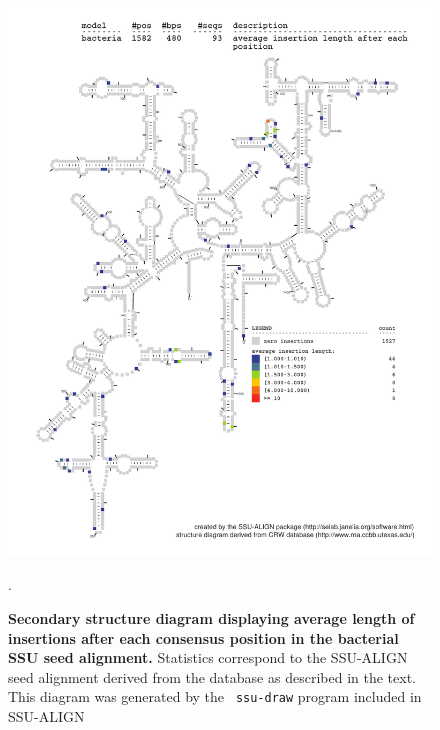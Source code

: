 \begin{figure}
\begin{center}
\includegraphics[width=5.7in]{Figures/bacteria-0p1-iavglen}
\end{center}
\caption[Secondary structure diagram displaying average length of insertions
  after each consensus position in the bacterial SSU seed
  alignment]{\textbf{Secondary structure diagram displaying average
    length of insertions after each consensus position in the bacterial SSU seed
  alignment.} Statistics correspond to the SSU-ALIGN seed
  alignment derived from the  database \cite{CannoneGutell02}
  as described in the text. This diagram was generated by the {\tt
  ssu-draw} program included in SSU-ALIGN}.
\label{fig:baciavglen}
\end{figure}


